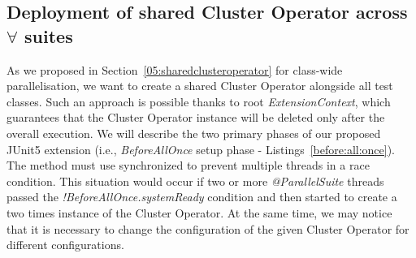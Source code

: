 \subsection{Deployment of shared Cluster Operator across $\forall$ suites}

As we proposed in Section~\ref{05:sharedclusteroperator} for class-wide parallelisation,
we want to create a shared Cluster Operator alongside all test classes.
Such an approach is possible thanks to root \emph{ExtensionContext}, which guarantees that the Cluster Operator instance
will be deleted only after the overall execution. We will describe the two primary phases of our proposed JUnit5 extension
(i.e., \emph{BeforeAllOnce} setup phase - Listings~\ref{before:all:once}).
The method must use synchronized to prevent multiple threads in a race condition.
This situation would occur if two or more \emph{@ParallelSuite} threads passed the \emph{!BeforeAllOnce.systemReady}
condition and then started to create a two times instance of the Cluster Operator.
At the same time, we may notice that it is necessary to change the configuration of the given Cluster Operator for different configurations.

